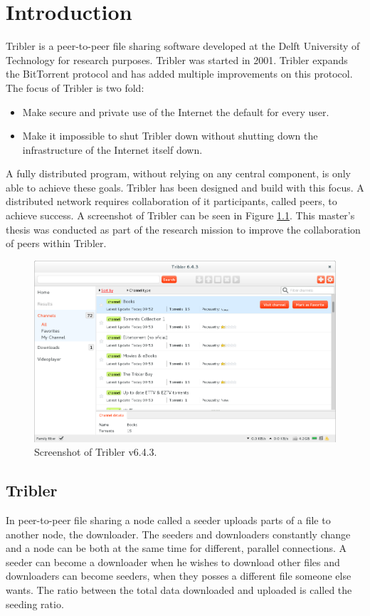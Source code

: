 \chapter{Introduction}
\label{chp:introduction}
Tribler is a peer-to-peer file sharing software developed at the Delft University of Technology for research purposes.
Tribler was started in 2001.
Tribler expands the BitTorrent protocol and has added multiple improvements on this protocol.
The focus of Tribler is two fold:
\begin{itemize}
    \item Make secure and private use of the Internet the default for every user.
    \item Make it impossible to shut Tribler down without shutting down the infrastructure of the Internet itself down.
\end{itemize}

A fully distributed program, without relying on any central component, is only able to achieve these goals.
Tribler has been designed and build with this focus\cite{Pouwelse-tribler}\cite{Bakker-tribler}.
A distributed network requires collaboration of it participants, called peers, to achieve success.
A screenshot of Tribler can be seen in Figure \ref{fig:tribler-screenshot}.
This master's thesis was conducted as part of the research mission to improve the collaboration of peers within Tribler.

\begin{figure}
	\centerline{\includegraphics[scale=0.3]{introduction/figs/tribler-screenshot.png}}
	\caption{Screenshot of Tribler v6.4.3.}
	\label{fig:tribler-screenshot}
\end{figure}

\section{Tribler}
In peer-to-peer file sharing a node called a seeder uploads parts
of a file to another node, the downloader.
The seeders and downloaders constantly change
and a node can be both at the same time for different, parallel connections.
A seeder can become a downloader when he wishes to download other files
and downloaders can become seeders,
when they posses a different file someone else wants.
The ratio between the total data downloaded and uploaded is called the seeding ratio\cite{Cohen-bittorrent}.

